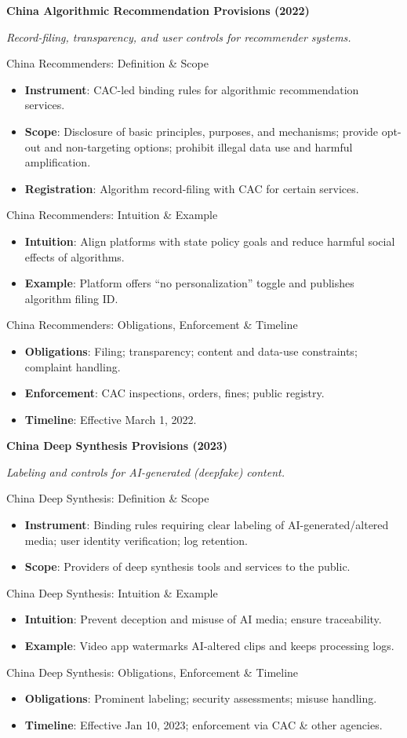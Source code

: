 \documentclass[aspectratio=169]{beamer}
\newcommand{\RegTitle}[2]{%
  \begin{frame}[plain]
    \centering
    \vfill
    {\usebeamerfont{title}\usebeamercolor[fg]{title}\LARGE \textbf{#1}\par}
    \vspace{0.4em}
    {\small \itshape #2\par}
    \vfill
  \end{frame}
}
\newcommand{\RegDef}[2]{%
  \begin{frame}{#1: Definition \& Scope}
    \begin{itemize}
      #2
    \end{itemize}
  \end{frame}
}
\newcommand{\RegIntuition}[2]{%
  \begin{frame}{#1: Intuition \& Example}
    \begin{itemize}
      #2
    \end{itemize}
  \end{frame}
}
\newcommand{\RegCompliance}[2]{%
  \begin{frame}{#1: Obligations, Enforcement \& Timeline}
    \begin{itemize}
      #2
    \end{itemize}
  \end{frame}
}
\begin{document}
\RegTitle{China Algorithmic Recommendation Provisions (2022)}{Record-filing, transparency, and user controls for recommender systems.}
\RegDef{China Recommenders}{%
  \item \textbf{Instrument}: CAC-led binding rules for algorithmic recommendation services.
  \item \textbf{Scope}: Disclosure of basic principles, purposes, and mechanisms; provide opt-out and non-targeting options; prohibit illegal data use and harmful amplification.
  \item \textbf{Registration}: Algorithm record-filing with CAC for certain services.
}
\RegIntuition{China Recommenders}{%
  \item \textbf{Intuition}: Align platforms with state policy goals and reduce harmful social effects of algorithms.
  \item \textbf{Example}: Platform offers ``no personalization'' toggle and publishes algorithm filing ID.
}
\RegCompliance{China Recommenders}{%
  \item \textbf{Obligations}: Filing; transparency; content and data-use constraints; complaint handling.
  \item \textbf{Enforcement}: CAC inspections, orders, fines; public registry.
  \item \textbf{Timeline}: Effective March 1, 2022.
}

\RegTitle{China Deep Synthesis Provisions (2023)}{Labeling and controls for AI-generated (deepfake) content.}
\RegDef{China Deep Synthesis}{%
  \item \textbf{Instrument}: Binding rules requiring clear labeling of AI-generated/altered media; user identity verification; log retention.
  \item \textbf{Scope}: Providers of deep synthesis tools and services to the public.
}
\RegIntuition{China Deep Synthesis}{%
  \item \textbf{Intuition}: Prevent deception and misuse of AI media; ensure traceability.
  \item \textbf{Example}: Video app watermarks AI-altered clips and keeps processing logs.
}
\RegCompliance{China Deep Synthesis}{%
  \item \textbf{Obligations}: Prominent labeling; security assessments; misuse handling.
  \item \textbf{Timeline}: Effective Jan 10, 2023; enforcement via CAC \& other agencies.
}
\end{document}

